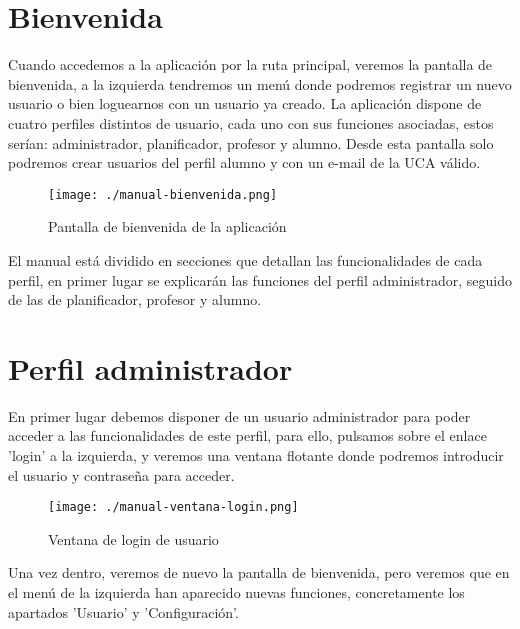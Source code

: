 \section{Bienvenida}

Cuando accedemos a la aplicación por la ruta principal, veremos la pantalla de bienvenida, a la izquierda tendremos un menú donde podremos registrar un nuevo usuario o bien loguearnos con un usuario ya creado. La aplicación dispone de cuatro perfiles distintos de usuario, cada uno con sus funciones asociadas, estos serían: administrador, planificador, profesor y alumno. Desde esta pantalla solo podremos crear usuarios del perfil alumno y con un e-mail de la UCA válido.\\

\begin{figure}[H] 
  \label{manual-bienvenida} 
	\begin{center}
    \texttt{[image: ./manual-bienvenida.png]}
  \end{center}
\caption{Pantalla de bienvenida de la aplicación}
\end{figure}

El manual está dividido en secciones que detallan las funcionalidades de cada perfil, en primer lugar se explicarán las funciones del perfil administrador, seguido de las de planificador, profesor y alumno.

\section{Perfil administrador}

En primer lugar debemos disponer de un usuario administrador para poder acceder a las funcionalidades de este perfil, para ello, pulsamos sobre el enlace 'login' a la izquierda, y veremos una ventana flotante donde podremos introducir el usuario y contraseña para acceder.\\

\begin{figure}[H] 
  \label{manual-login} 
	\begin{center}
    \texttt{[image: ./manual-ventana-login.png]}
  \end{center}
\caption{Ventana de login de usuario}
\end{figure}

Una vez dentro, veremos de nuevo la pantalla de bienvenida, pero veremos que en el menú de la izquierda han aparecido nuevas funciones, concretamente los apartados 'Usuario' y 'Configuración'.

